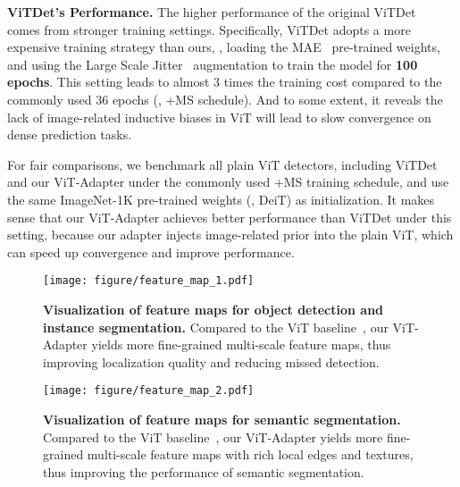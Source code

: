 \documentclass{article} \usepackage{iclr2023_conference,times}
\begin{document}
\noindent\textbf{ViTDet's Performance.}
The higher performance of the original ViTDet~\citep{li2022exploring} comes from stronger training settings. Specifically, ViTDet adopts a more expensive training strategy than ours, \ie, loading the MAE~\citep{he2021masked} pre-trained weights, and using the Large Scale Jitter~\citep{ghiasi2021simple} augmentation to train the model for \textbf{100 epochs}. This setting leads to almost 3 times the training cost compared to the commonly used 36 epochs (\ie, +MS schedule). And to some extent, it reveals the lack of image-related inductive biases in ViT will lead to slow convergence on dense prediction tasks.

For fair comparisons, we benchmark all plain ViT detectors, including ViTDet~\citep{li2022exploring} and our ViT-Adapter under the commonly used +MS training schedule, and use the same ImageNet-1K pre-trained weights (\ie, DeiT) as initialization. It makes sense that our ViT-Adapter achieves better performance than ViTDet under this setting, because our adapter injects image-related prior into the plain ViT, which can speed up convergence and improve performance.




\begin{figure}[t]
    \centering
    \texttt{[image: figure/feature\_map\_1.pdf]}
    \caption{
        \textbf{Visualization of feature maps for object detection and instance segmentation. }
        Compared to the ViT baseline~\citep{li2021benchmarking}, our ViT-Adapter yields more fine-grained multi-scale feature maps, thus improving localization quality and reducing missed detection.
        }
    \label{fig:feature_map_1}
\end{figure}


\begin{figure}[t]
    \centering
    \texttt{[image: figure/feature\_map\_2.pdf]}
    \caption{
        \textbf{Visualization of feature maps for semantic segmentation. }
        Compared to the ViT baseline~\citep{li2021benchmarking}, our ViT-Adapter yields more fine-grained multi-scale feature maps with rich local edges and textures, thus improving the performance of semantic segmentation.
        }
    \label{fig:feature_map_2}
\end{figure}
\end{document}
